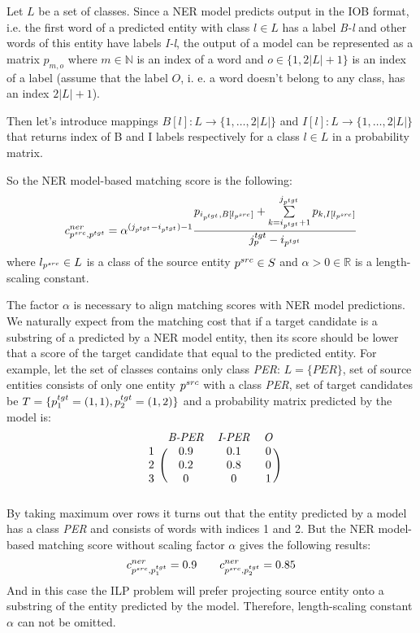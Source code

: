 Let \( L \) be a set of classes. Since a NER model predicts output in the IOB format, i.e. the first word of a predicted
entity with class \( l \in L \) has a label \textit{B-l} and other words of this entity have labels \textit{I-l},
the output of a model can be represented as a matrix \( p_{m, o} \) where \( m \in \mathbb{N} \) is an index of a word and
\( o \in \{ 1, 2|L| + 1 \} \) is an index of a label (assume that the label \( O \), i. e. a word doesn't belong to any class,
has an index \( 2|L| + 1 \)).

Then let's introduce mappings \( B[l]: L \rightarrow \{ 1, \dots, 2|L| \} \) and
\( I[l]: L \rightarrow \{ 1, \dots, 2|L| \} \) that returns index of B and I labels respectively
for a class \( l \in L \) in a probability matrix.

So the NER model-based matching score is the following:
\begin{equation} \label{eq:ner_cost}
    c_{p^{src}, p^{tgt}}^{ner} = \alpha^{(j_{p^{tgt}} - i_{p^{tgt}}) - 1}
    \frac{
        p_{i_{p^{tgt}}, B[l_{p^{src}}]} +
        \sum\limits_{k = i_{p^{tgt}} + 1}^{j_{p^{tgt}}} p_{k, I[l_{p^{src}}]}
    }
    {j_p^{tgt} - i_{p^{tgt}}}
\end{equation}
where \( l_{p^{src}} \in L \) is a class of the source entity \( p^{src} \in S \) and
\( \alpha > 0 \in \mathbb{R} \) is a length-scaling constant.

The factor \( \alpha \) is necessary to align matching scores with NER model predictions.
We naturally expect from the matching cost that if a target candidate is a substring of a predicted
by a NER model entity, then its score should be lower that a score of the target candidate that
equal to the predicted entity. For example, let the set of classes contains only class \textit{PER}: \( L = \{ PER \}\),
set of source entities consists of only one entity \( p^{src} \) with a class \textit{PER},
set of target candidates be \( T =  \{ p_1^{tgt} = (1, 1), p_2^{tgt} = (1, 2) \} \) and a probability matrix predicted by the model is:
\[
    \begin{blockarray}{cccc}
        & \text{\textit{B-PER}} & \text{\textit{I-PER}} & \text{\textit{O}} \\
        \begin{block}{c(ccc)}
            1 & 0.9 & 0.1 & 0 \\
            2 & 0.2 & 0.8 & 0 \\
            3 & 0   & 0   & 1 \\
        \end{block}
    \end{blockarray}
\]
By taking maximum over rows it turns out that the entity predicted by a model has a class \textit{PER} and
consists of words with indices 1 and 2. But the NER model-based matching score without scaling factor
\( \alpha \) gives the following results:
\[
    c_{p^{src}, p_1^{tgt}}^{ner} = 0.9 \qquad c_{p^{src}, p_2^{tgt}}^{ner} = 0.85
\]
And in this case the ILP problem will prefer projecting source entity onto a substring of the entity predicted
by the model. Therefore, length-scaling constant \( \alpha \) can not be omitted.

